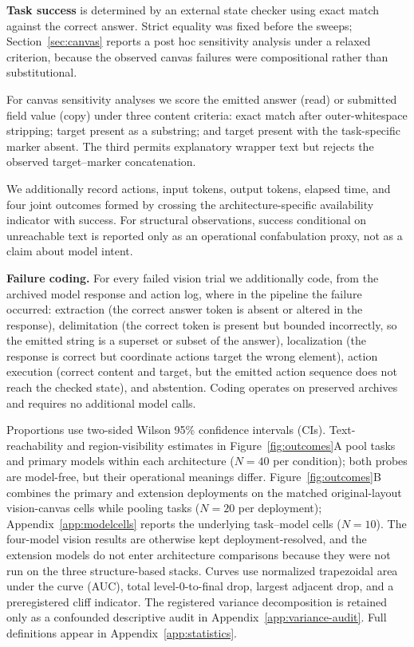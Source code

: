 \documentclass{article}
\begin{document}
\textbf{Task success} is determined by an external state checker using exact match against the correct answer. Strict equality was fixed before the sweeps; Section~\ref{sec:canvas} reports a post hoc sensitivity analysis under a relaxed criterion, because the observed canvas failures were compositional rather than substitutional.

For canvas sensitivity analyses we score the emitted answer (read) or submitted field value (copy) under three content criteria: exact match after outer-whitespace stripping; target present as a substring; and target present with the task-specific marker absent. The third permits explanatory wrapper text but rejects the observed target--marker concatenation.

We additionally record actions, input tokens, output tokens, elapsed time, and four joint outcomes formed by crossing the architecture-specific availability indicator with success. For structural observations, success conditional on unreachable text is reported only as an operational confabulation proxy, not as a claim about model intent.

\textbf{Failure coding.} For every failed vision trial we additionally code, from the archived model response and action log, where in the pipeline the failure occurred: extraction (the correct answer token is absent or altered in the response), delimitation (the correct token is present but bounded incorrectly, so the emitted string is a superset or subset of the answer), localization (the response is correct but coordinate actions target the wrong element), action execution (correct content and target, but the emitted action sequence does not reach the checked state), and abstention. Coding operates on preserved archives and requires no additional model calls.

Proportions use two-sided Wilson 95\% confidence intervals (CIs). Text-reachability and region-visibility estimates in Figure~\ref{fig:outcomes}A pool tasks and primary models within each architecture ($N=40$ per condition); both probes are model-free, but their operational meanings differ. Figure~\ref{fig:outcomes}B combines the primary and extension deployments on the matched original-layout vision-canvas cells while pooling tasks ($N=20$ per deployment); Appendix~\ref{app:modelcells} reports the underlying task--model cells ($N=10$). The four-model vision results are otherwise kept deployment-resolved, and the extension models do not enter architecture comparisons because they were not run on the three structure-based stacks. Curves use normalized trapezoidal area under the curve (AUC), total level-0-to-final drop, largest adjacent drop, and a preregistered cliff indicator. The registered variance decomposition is retained only as a confounded descriptive audit in Appendix~\ref{app:variance-audit}. Full definitions appear in Appendix~\ref{app:statistics}.
\end{document}
